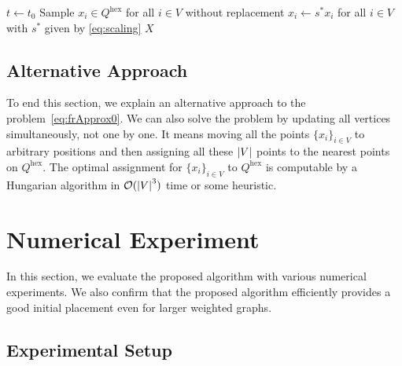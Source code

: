 \documentclass[11pt]{article}
\begin{document}
\begin{algorithm}
  [ht]
  \caption{Proposed algorithm for the initial placement}
  \label{alg:proposed} 
   $t \gets t_{0}$\;
  Sample $x_{i}\in Q^{\mathrm{hex}}$ for all $i \in V$ without replacement\; 
  $x_{i}\gets s^{*}x_{i}$ for all $i \in V$ with $s^{*}$ given by \cref{eq:scaling}\;
  \Return $X$
\end{algorithm}

\subsection{Alternative Approach}
\label{ssec:alternative}

To end this section, we explain an alternative approach to the problem~\eqref{eq:frApprox0}.
We can also solve the problem by updating all vertices simultaneously, not one
by one. It means moving all the points $\{x_{i}\}_{i \in V}$ to arbitrary positions
and then assigning all these $\abs{V}$ points to the nearest points on $Q^{\mathrm{hex}}$.
The optimal assignment for $\{x_{i}\}_{i \in V}$ to $Q^{\mathrm{hex}}$ is
computable by a Hungarian algorithm in $\order*{\abs{V}^3}$ time or some
heuristic.

\section{Numerical Experiment}
\label{sec:experiment}

In this section, we evaluate the proposed algorithm with various numerical
experiments. We also confirm that the proposed algorithm efficiently provides a
good initial placement even for larger weighted graphs.

\subsection{Experimental Setup}
\label{ssec:setup}
\end{document}
